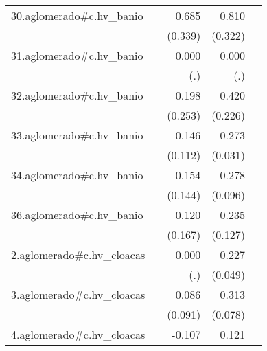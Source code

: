 {\begin{longtable}{l*{4}{D{.}{.}{-1}}}
\addlinespace
30.aglomerado#c.hv\_banio&                     &       0.685\sym{*}  &       0.810\sym{*}  &                     \\
            &                     &     (0.339)         &     (0.322)         &                     \\
\addlinespace
31.aglomerado#c.hv\_banio&                     &       0.000         &       0.000         &                     \\
            &                     &         (.)         &         (.)         &                     \\
\addlinespace
32.aglomerado#c.hv\_banio&                     &       0.198         &       0.420         &                     \\
            &                     &     (0.253)         &     (0.226)         &                     \\
\addlinespace
33.aglomerado#c.hv\_banio&                     &       0.146         &       0.273\sym{***}&                     \\
            &                     &     (0.112)         &     (0.031)         &                     \\
\addlinespace
34.aglomerado#c.hv\_banio&                     &       0.154         &       0.278\sym{**} &                     \\
            &                     &     (0.144)         &     (0.096)         &                     \\
\addlinespace
36.aglomerado#c.hv\_banio&                     &       0.120         &       0.235         &                     \\
            &                     &     (0.167)         &     (0.127)         &                     \\
\addlinespace
2.aglomerado#c.hv\_cloacas&                     &       0.000         &       0.227\sym{***}&                     \\
            &                     &         (.)         &     (0.049)         &                     \\
\addlinespace
3.aglomerado#c.hv\_cloacas&                     &       0.086         &       0.313\sym{***}&                     \\
            &                     &     (0.091)         &     (0.078)         &                     \\
\addlinespace
4.aglomerado#c.hv\_cloacas&                     &      -0.107         &       0.121\sym{***}&                     \\

\end{longtable}}
